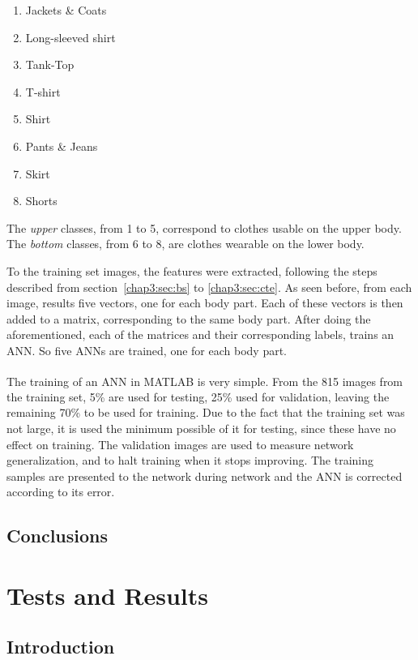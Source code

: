 \documentclass[titlepage,12pt,a4paper,times]{book}
\begin{document}
\begin{enumerate}
	\item Jackets \& Coats
	\item Long-sleeved shirt
	\item Tank-Top
	\item T-shirt
	\item Shirt
	\item Pants \& Jeans
	\item Skirt
	\item Shorts
\end{enumerate}
The \emph{upper} classes, from 1 to 5, correspond to clothes usable on the
upper body. The \emph{bottom} classes, from 6 to 8, are clothes wearable on the
lower body.

To the training set images, the features were extracted, following the steps
described from section~\ref{chap3:sec:bs} to \ref{chap3:sec:cte}. As seen
before, from each image, results five vectors, one for each body part. Each of
these vectors is then added to a matrix, corresponding to the same body part.
After doing the aforementioned, each of the matrices and their corresponding
labels, trains an \ac{ANN}. So five \acp{ANN} are trained, one for each body
part.

The training of an \ac{ANN} in MATLAB\textsuperscript{\textregistered} is very
simple. From the 815 images from the training set, 5\% are used for testing,
25\% used for validation, leaving the remaining 70\% to be used for training.
Due to the fact that the training set was not large, it is used the minimum
possible of it for testing, since these have no effect on training. The
validation images are used to measure network generalization, and to halt
training when it stops improving. The training samples are presented to the
network during network and the \ac{ANN} is corrected according to its error.

\section{Conclusions}
\label{chap3:sec:concs}

\chapter{Tests and Results}
\label{chap:res}

\section{Introduction}
\label{chap4:sec:intro}
\end{document}
